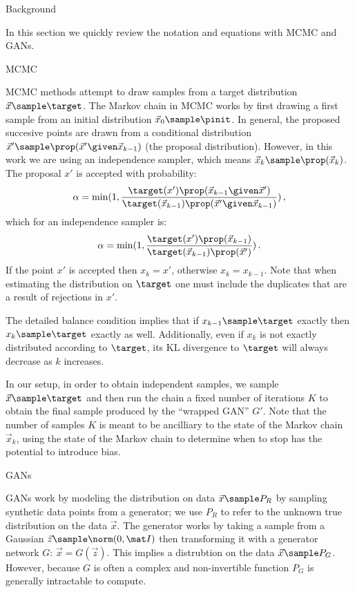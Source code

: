 Background

In this section we quickly review the notation and equations with MCMC and GANs.

MCMC

MCMC methods attempt to draw samples from a target distribution $\vec x \sample \target$.
The Markov chain in MCMC works by first drawing a first sample from an initial distribution $\vec x_0 \sample \pinit$.
In general, the proposed succesive points are drawn from a conditional distribution $\vec x' \sample \prop(\vec x' \given \vec x_{k-1})$ (the proposal distribution)\@.
However, in this work we are using an independence sampler, which means $\vec x_k \sample \prop(\vec x_k)$.
The proposal $x'$ is accepted with probability:
\begin{align}
  \alpha = \min(1, \frac{\target(x')\prop(\vec x_{k-1} \given \vec x')}{\target(\vec x_{k-1})\prop(\vec x' \given \vec x_{k-1})})\,,
\end{align}
which for an independence sampler is:
\begin{align}
  \alpha = \min(1, \frac{\target(x')\prop(\vec x_{k-1})}{\target(\vec x_{k-1})\prop(\vec x')})\,.
\end{align}
If the point $x'$ is accepted then $x_k = x'$, otherwise $x_k = x_{k-1}$.
Note that when estimating the distribution on $\target$ one must include the duplicates that are a result of rejections in $x'$.

The detailed balance condition implies that if $x_{k-1} \sample \target$ exactly then $x_k \sample \target$ exactly as well.
Additionally, even if $x_k$ is not exactly distributed according to $\target$, its KL divergence to $\target$ will always decrease as $k$ increases.  %

In our setup, in order to obtain independent samples, we sample $\vec x \sample \target$ and then run the chain a fixed number of iterations $K$ to obtain the final sample produced by the ``wrapped GAN'' $G'$.
Note that the number of samples $K$ is meant to be ancilliary to the state of the Markov chain $\vec x_k$, using the state of the Markov chain to determine when to stop has the potential to introduce bias.  %

GANs

GANs work by modeling the distribution on data $\vec x \sample P_R$ by sampling synthetic data points from a generator; we use $P_R$ to refer to the unknown true distribution on the data $\vec x$.
The generator works by taking a sample from a Gaussian $\vec z \sample \norm(0,\mat I)$ then transforming it with a generator network $G$: $\vec x = G(\vec z)$.
This implies a distrubtion on the data $\vec x \sample P_G$.  %
However, because $G$ is often a complex and non-invertible function $P_G$ is generally intractable to compute.

